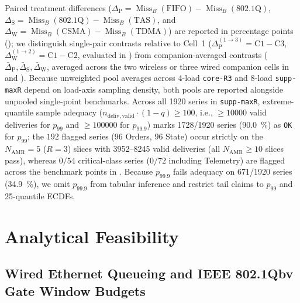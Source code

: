 \documentclass[11pt,a4paper]{article}
\newcommand{\Namr}{\ensuremath{N_{\mathrm{AMR}}}}
\newcommand{\MissB}{\ensuremath{\operatorname{Miss}_B}}
\newcommand{\GainP}{\ensuremath{\Delta_{\mathrm{P}}}}
\newcommand{\GainS}{\ensuremath{\Delta_{\mathrm{S}}}}
\newcommand{\GainW}{\ensuremath{\Delta_{\mathrm{W}}}}
\newcommand{\GainPbar}{\ensuremath{\bar{\Delta}_{\mathrm{P}}}}
\newcommand{\GainSbar}{\ensuremath{\bar{\Delta}_{\mathrm{S}}}}
\newcommand{\GainWbar}{\ensuremath{\bar{\Delta}_{\mathrm{W}}}}
\newcommand{\GainPpair}{\ensuremath{\Delta_{\mathrm{P}}^{(1\to 3)}}}
\newcommand{\GainWpair}{\ensuremath{\Delta_{\mathrm{W}}^{(1\to 2)}}}
\begin{document}
Paired treatment differences ($\GainP = \MissB(\text{FIFO}) - \MissB(\text{802.1Q})$, $\GainS = \MissB(\text{802.1Q}) - \MissB(\text{TAS})$, and $\GainW = \MissB(\text{CSMA}) - \MissB(\text{TDMA})$) are reported in percentage points (\si{\pp}); we distinguish single-pair contrasts relative to Cell~1 ($\GainPpair = \mathrm{C1} - \mathrm{C3}$, $\GainWpair = \mathrm{C1} - \mathrm{C2}$, evaluated in ) from companion-averaged contrasts ($\GainPbar, \GainSbar, \GainWbar$, averaged across the two wireless or three wired companion cells in  and ). Because unweighted pool averages across 4-load \texttt{core-R3} and 8-load \texttt{supp-maxR} depend on load-axis sampling density, both pools are reported alongside unpooled single-point benchmarks. Across all \num{1920} series in \texttt{supp-maxR}, extreme-quantile sample adequacy ($n_{\mathrm{deliv,valid}} \cdot (1 - q) \ge 100$, i.e., $\ge \num{10000}$ valid deliveries for $p_{99}$ and $\ge \num{100000}$ for $p_{99.9}$) marks \num{1728}/\num{1920} series (\qty{90.0}{\percent}) as \texttt{OK} for $p_{99}$; the $192$ flagged series ($96$ Orders, $96$ State) occur strictly on the $\Namr=5$ ($R=3$) slices with \numrange{3952}{8245} valid deliveries (all $\Namr \ge 10$ slices pass), whereas $0/54$ critical-class series ($0/72$ including Telemetry) are flagged across the benchmark points in . Because $p_{99.9}$ fails adequacy on \num{671}/\num{1920} series (\qty{34.9}{\percent}), we omit $p_{99.9}$ from tabular inference and restrict tail claims to $p_{99}$ and 25-quantile ECDFs.

\section{Analytical Feasibility}
\label{sec:analytical}

\subsection{Wired Ethernet Queueing and IEEE 802.1Qbv Gate Window Budgets}
\label{sec:analytical_wired}
\end{document}
